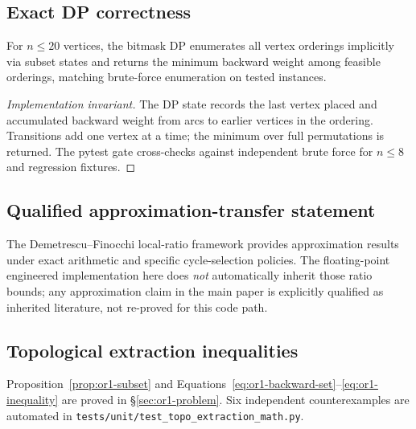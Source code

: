 \subsection{Exact DP correctness}

\begin{proposition}
For $n\le 20$ vertices, the bitmask DP enumerates all vertex orderings implicitly via subset states and returns the minimum backward weight among feasible orderings, matching brute-force enumeration on tested instances.
\end{proposition}

\begin{proof}[Implementation invariant]
The DP state records the last vertex placed and accumulated backward weight from arcs to earlier vertices in the ordering. Transitions add one vertex at a time; the minimum over full permutations is returned. The pytest gate cross-checks against independent brute force for $n\le 8$ and regression fixtures.
\end{proof}

\subsection{Qualified approximation-transfer statement}

The Demetrescu--Finocchi local-ratio framework provides approximation results under exact arithmetic and specific cycle-selection policies. The floating-point engineered implementation here does \emph{not} automatically inherit those ratio bounds; any approximation claim in the main paper is explicitly qualified as inherited literature, not re-proved for this code path.

\subsection{Topological extraction inequalities}

Proposition~\ref{prop:or1-subset} and Equations~\eqref{eq:or1-backward-set}--\eqref{eq:or1-inequality} are proved in \S\ref{sec:or1-problem}. Six independent counterexamples are automated in \texttt{tests/unit/test\_topo\_extraction\_math.py}.
